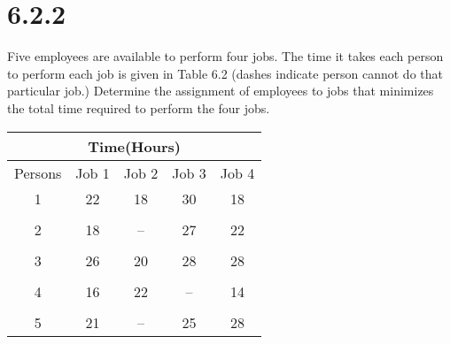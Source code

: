 \documentclass{article}
\begin{document}
\section*{6.2.2}
Five employees are available to perform four jobs. The time it takes each person to perform each job is given in Table 6.2 (dashes indicate person cannot do that particular job.) Determine the assignment of employees to jobs that minimizes the total time required to perform the four jobs.
\begin{table}[h!]
    \centering
    \begin{tabular}{| c | c c c c |}
        \hline
        \multicolumn{5}{|c|}{Time(Hours)} \\
        \hline
        Persons & Job 1 & Job 2 & Job 3 & Job 4\\
        \hline
        1& 22 & 18 & 30 & 18\\
        &&&&\\
        2& 18 & -- & 27 & 22\\
        &&&&\\
        3& 26 & 20 & 28 & 28\\
        &&&&\\
        4& 16 & 22 & -- & 14\\
        &&&&\\
        5& 21 & -- & 25 & 28\\
        \hline
    \end{tabular}
\end{table}
\end{document}
